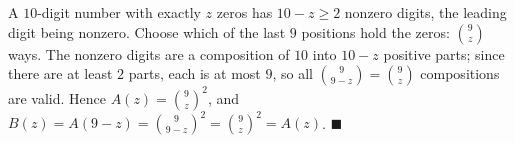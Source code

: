 A $10$-digit number with exactly $z$ zeros has $10-z\ge2$ nonzero digits, the leading digit being nonzero. Choose which of the last $9$ positions hold the zeros: $\binom9z$ ways. The nonzero digits are a composition of $10$ into $10-z$ positive parts; since there are at least $2$ parts, each is at most $9$, so all $\binom9{9-z}=\binom9z$ compositions are valid. Hence $A(z)=\binom9z^2$, and $B(z)=A(9-z)=\binom9{9-z}^2=\binom9z^2=A(z)$. $\blacksquare$
